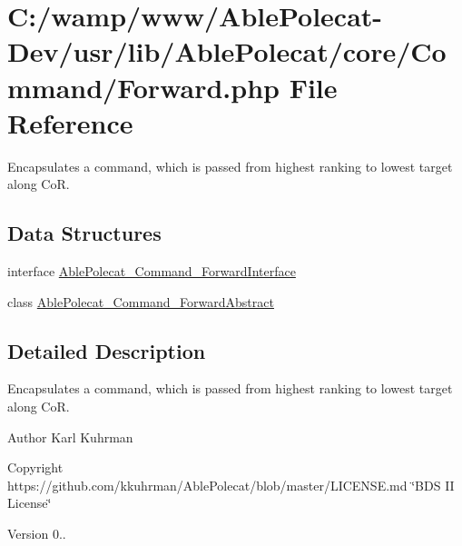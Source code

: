 \hypertarget{_forward_8php}{}\section{C\+:/wamp/www/\+Able\+Polecat-\/\+Dev/usr/lib/\+Able\+Polecat/core/\+Command/\+Forward.php File Reference}
\label{_forward_8php}


Encapsulates a command, which is passed from highest ranking to lowest target along Co\+R.  


\subsection*{Data Structures}
\begin{DoxyCompactItemize}
\item 
interface \hyperlink{interface_able_polecat___command___forward_interface}{Able\+Polecat\+\_\+\+Command\+\_\+\+Forward\+Interface}
\item 
class \hyperlink{class_able_polecat___command___forward_abstract}{Able\+Polecat\+\_\+\+Command\+\_\+\+Forward\+Abstract}
\end{DoxyCompactItemize}


\subsection{Detailed Description}
Encapsulates a command, which is passed from highest ranking to lowest target along Co\+R. 

\begin{DoxyAuthor}{Author}
Karl Kuhrman 
\end{DoxyAuthor}
\begin{DoxyCopyright}{Copyright}
https\+://github.com/kkuhrman/\+Able\+Polecat/blob/master/\+L\+I\+C\+E\+N\+S\+E.\+md \char`\"{}\+B\+D\+S I\+I License\char`\"{} 
\end{DoxyCopyright}
\begin{DoxyVersion}{Version}
0.. 
\end{DoxyVersion}
